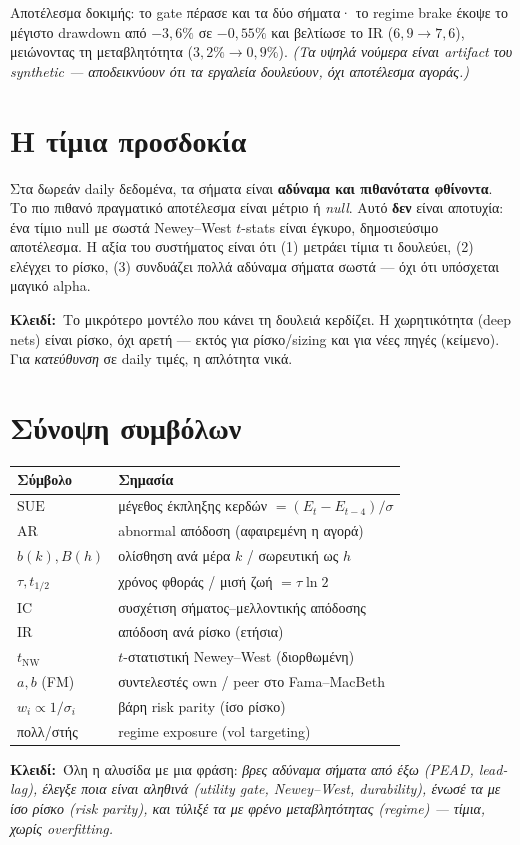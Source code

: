 \documentclass[11pt]{article}
\newcommand{\key}[1]{\par\medskip\noindent\colorbox{soft}{\parbox{\dimexpr\linewidth-2\fboxsep}{\textcolor{accent}{\textbf{Κλειδί:}}\ #1}}\par\medskip}
\begin{document}
Αποτέλεσμα δοκιμής: το gate πέρασε και τα δύο σήματα· το regime brake έκοψε το μέγιστο drawdown
από $-3{,}6\%$ σε $-0{,}55\%$ και βελτίωσε το IR ($6{,}9\!\to\!7{,}6$), μειώνοντας τη
μεταβλητότητα ($3{,}2\%\!\to\!0{,}9\%$). \emph{(Τα υψηλά νούμερα είναι artifact του synthetic —
αποδεικνύουν ότι τα εργαλεία δουλεύουν, όχι αποτέλεσμα αγοράς.)}

\section{Η τίμια προσδοκία}

Στα δωρεάν daily δεδομένα, τα σήματα είναι \textbf{αδύναμα και πιθανότατα φθίνοντα}. Το πιο
πιθανό πραγματικό αποτέλεσμα είναι μέτριο ή \emph{null}. Αυτό \textbf{δεν} είναι αποτυχία: ένα
τίμιο null με σωστά Newey--West $t$-stats είναι έγκυρο, δημοσιεύσιμο αποτέλεσμα. Η αξία του
συστήματος είναι ότι (1) μετράει τίμια τι δουλεύει, (2) ελέγχει το ρίσκο, (3) συνδυάζει πολλά
αδύναμα σήματα σωστά — όχι ότι υπόσχεται μαγικό alpha.

\key{Το μικρότερο μοντέλο που κάνει τη δουλειά κερδίζει. Η χωρητικότητα (deep nets) είναι
ρίσκο, όχι αρετή — εκτός για ρίσκο/sizing και για νέες πηγές (κείμενο). Για \emph{κατεύθυνση}
σε daily τιμές, η απλότητα νικά.}

\section{Σύνοψη συμβόλων}
\begin{center}\renewcommand{\arraystretch}{1.3}
\begin{tabular}{@{}ll@{}}\hline
\textbf{Σύμβολο} & \textbf{Σημασία}\\\hline
$\mathrm{SUE}$ & μέγεθος έκπληξης κερδών $=(E_t-E_{t-4})/\sigma$\\
$\mathrm{AR}$ & abnormal απόδοση (αφαιρεμένη η αγορά)\\
$b(k),B(h)$ & ολίσθηση ανά μέρα $k$ / σωρευτική ως $h$\\
$\tau,t_{1/2}$ & χρόνος φθοράς / μισή ζωή $=\tau\ln2$\\
$\mathrm{IC}$ & συσχέτιση σήματος–μελλοντικής απόδοσης\\
$\mathrm{IR}$ & απόδοση ανά ρίσκο (ετήσια)\\
$t_{\text{NW}}$ & $t$-στατιστική Newey--West (διορθωμένη)\\
$a,b$ (FM) & συντελεστές own / peer στο Fama--MacBeth\\
$w_i\propto1/\sigma_i$ & βάρη risk parity (ίσο ρίσκο)\\
πολλ/στής & regime exposure (vol targeting)\\\hline
\end{tabular}\end{center}

\bigskip
\key{Όλη η αλυσίδα με μια φράση: \emph{βρες αδύναμα σήματα από έξω (PEAD, lead-lag), έλεγξε
ποια είναι αληθινά (utility gate, Newey--West, durability), ένωσέ τα με ίσο ρίσκο (risk parity),
και τύλιξέ τα με φρένο μεταβλητότητας (regime) — τίμια, χωρίς overfitting.}}
\end{document}
